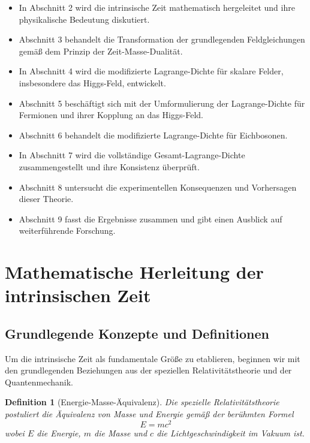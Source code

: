 \documentclass[a4paper,12pt]{article}
\newtheorem{definition}{Definition}[section]
\begin{document}
	\begin{itemize}
		\item In Abschnitt 2 wird die intrinsische Zeit mathematisch hergeleitet und ihre physikalische Bedeutung diskutiert.
		\item Abschnitt 3 behandelt die Transformation der grundlegenden Feldgleichungen gemäß dem Prinzip der Zeit-Masse-Dualität.
		\item In Abschnitt 4 wird die modifizierte Lagrange-Dichte für skalare Felder, insbesondere das Higgs-Feld, entwickelt.
		\item Abschnitt 5 beschäftigt sich mit der Umformulierung der Lagrange-Dichte für Fermionen und ihrer Kopplung an das Higgs-Feld.
		\item Abschnitt 6 behandelt die modifizierte Lagrange-Dichte für Eichbosonen.
		\item In Abschnitt 7 wird die vollständige Gesamt-Lagrange-Dichte zusammengestellt und ihre Konsistenz überprüft.
		\item Abschnitt 8 untersucht die experimentellen Konsequenzen und Vorhersagen dieser Theorie.
		\item Abschnitt 9 fasst die Ergebnisse zusammen und gibt einen Ausblick auf weiterführende Forschung.
	\end{itemize}
	
	\section{Mathematische Herleitung der intrinsischen Zeit}
	
	\subsection{Grundlegende Konzepte und Definitionen}
	
	Um die intrinsische Zeit als fundamentale Größe zu etablieren, beginnen wir mit den grundlegenden Beziehungen aus der speziellen Relativitätstheorie und der Quantenmechanik.
	
	\begin{definition}[Energie-Masse-Äquivalenz]
		Die spezielle Relativitätstheorie postuliert die Äquivalenz von Masse und Energie gemäß der berühmten Formel
		\begin{equation}
			E = mc^2
		\end{equation}
		wobei \( E \) die Energie, \( m \) die Masse und \( c \) die Lichtgeschwindigkeit im Vakuum ist.
	\end{definition}
	
\end{document}
